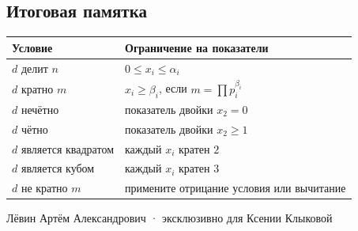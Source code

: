 \documentclass[a4paper,12pt]{article}
\begin{document}
\subsection*{Итоговая памятка}
\begin{tabularx}{\linewidth}{@{}p{54mm}X@{}}
\toprule
\textbf{Условие} & \textbf{Ограничение на показатели}\\
\midrule
$d$ делит $n$ & $0\le x_i\le\alpha_i$\\
$d$ кратно $m$ & $x_i\ge\beta_i$, если $m=\prod p_i^{\beta_i}$\\
$d$ нечётно & показатель двойки $x_2=0$\\
$d$ чётно & показатель двойки $x_2\ge1$\\
$d$ является квадратом & каждый $x_i$ кратен $2$\\
$d$ является кубом & каждый $x_i$ кратен $3$\\
$d$ не кратно $m$ & примените отрицание условия или вычитание\\
\bottomrule
\end{tabularx}
\vfill
\begin{center}
{\footnotesize\color{lightgray}Лёвин Артём Александрович · эксклюзивно для Ксении Клыковой}
\end{center}
\end{document}
